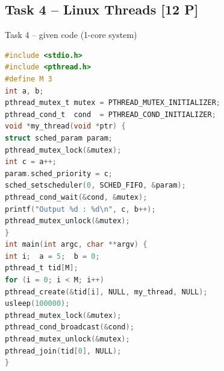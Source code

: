 \subsection{Task 4 -- Linux Threads [12 P]}

\begin{examplecode}{Task 4 -- given code (1-core system)}
\begin{lstlisting}[language=C, style=basesmol, aboveskip=2pt, belowskip=2pt]
#include <stdio.h>
#include <pthread.h>
#define M 3
int a, b;
pthread_mutex_t mutex = PTHREAD_MUTEX_INITIALIZER;
pthread_cond_t  cond  = PTHREAD_COND_INITIALIZER;
void *my_thread(void *ptr) {
struct sched_param param;
pthread_mutex_lock(&mutex);
int c = a++;
param.sched_priority = c;
sched_setscheduler(0, SCHED_FIFO, &param);
pthread_cond_wait(&cond, &mutex);
printf("Output %d : %d\n", c, b++);
pthread_mutex_unlock(&mutex);
}
int main(int argc, char **argv) {
int i;  a = 5;  b = 0;
pthread_t tid[M];
for (i = 0; i < M; i++)
pthread_create(&tid[i], NULL, my_thread, NULL);
usleep(100000);
pthread_mutex_lock(&mutex);
pthread_cond_broadcast(&cond);
pthread_mutex_unlock(&mutex);
pthread_join(tid[0], NULL);
}
\end{lstlisting}
\end{examplecode}

